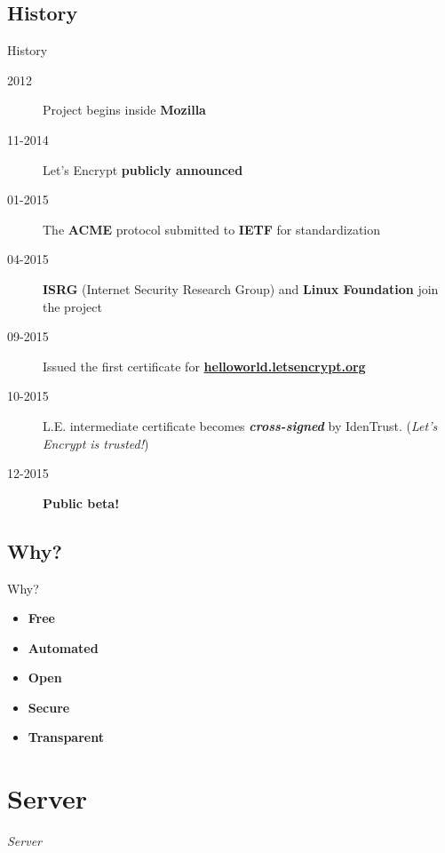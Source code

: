 \documentclass[xcolor=svgnames,11pt]{beamer}
\begin{document}
\subsection{History}
\begin{frame}{History}
\begin{description}
  \item[2012] Project begins inside \textbf{Mozilla}
  \pause
  \item[11-2014] Let's Encrypt \textbf{publicly announced}
  \pause
  \item[01-2015] The \textbf{ACME} protocol submitted to \textbf{IETF} for standardization
  \pause
  \item[04-2015] \textbf{ISRG} (Internet Security Research Group) and \textbf{Linux Foundation} join the project
  \pause
  \item[09-2015] Issued the first certificate for \textbf{\href{https://helloworld.letsencrypt.org/}{helloworld.letsencrypt.org}}
  \pause
  \item[10-2015] L.E. intermediate certificate becomes \textbf{\emph{cross-signed}} by IdenTrust.
  (\emph{Let's Encrypt is trusted!})
  \pause
  \item[12-2015] \textbf{Public beta!}
\end{description}
\end{frame}

\subsection{Why?}
\begin{frame}{Why?}
\begin{itemize}
  \item \textbf{Free}
  \medskip\pause
  \item \textbf{Automated}
  \medskip\pause
  \item \textbf{Open}
  \medskip\pause
  \item \textbf{Secure}
  \medskip\pause
  \item \textbf{Transparent}
\end{itemize}
\end{frame}

\section{Server}
\begin{frame}{}
\begin{center}
\begin{Huge}
\textcolor{leorange}{\emph{Server}}
\end{Huge}
\end{center}
\end{frame}
\end{document}
